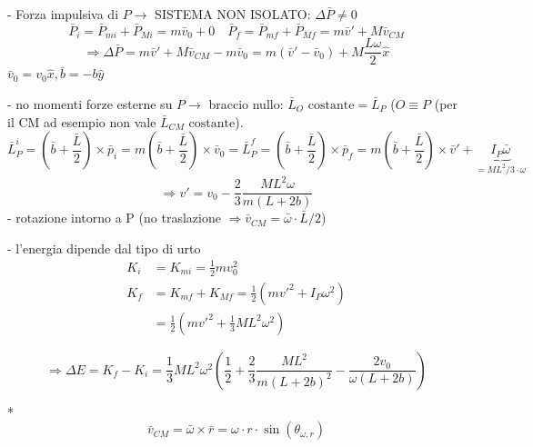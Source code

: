 \begin{figure}[H]
\raggedleft
{}
\end{figure}

- Forza impulsiva di $P \rightarrow$ SISTEMA NON ISOLATO: $\Delta \bar{P} \neq 0$
$$ \bar{P}_i = \bar{P}_{mi} + \bar{P}_{Mi} = m\bar{v}_0 + 0 \quad \bar{P}_f = \bar{P}_{mf} + \bar{P}_{Mf} = m\bar{v}' + M\bar{v}_{CM} $$
$$ \Rightarrow \Delta \bar{P} = m\bar{v}' + M\bar{v}_{CM} - m\bar{v}_0 = m(\bar{v}' - \bar{v}_0) + M \frac{L \omega}{2} \hat{x} $$
$\bar{v}_0 = v_0 \hat{x}, \bar{b} = -b \hat{y}$

- no momenti forze esterne su $P \rightarrow$ braccio nullo: $\bar{L}_O \text{ costante} = \bar{L}_P$
($O \equiv P$ (per il CM ad esempio non vale $\bar{L}_{CM} \text{ costante}$).
$$ \bar{L}_P^i = \left(\bar{b} + \frac{\bar{L}}{2}\right) \times \bar{p}_i = m\left(\bar{b} + \frac{\bar{L}}{2}\right) \times \bar{v}_0 = \bar{L}_P^f = \left(\bar{b} + \frac{\bar{L}}{2}\right) \times \bar{p}_f = m\left(\bar{b} + \frac{\bar{L}}{2}\right) \times \bar{v}' + \underbrace{I_P \bar{\omega}}_{= ML^2/3 \cdot \omega} $$
$$ \Rightarrow v' = v_0 - \frac{2}{3} \frac{M L^2 \omega}{m(L+2b)} $$
- rotazione intorno a P (no traslazione $\Rightarrow \bar{v}_{CM} = \bar{\omega} \cdot \bar{L}/2$)

- l'energia dipende dal tipo di urto
\begin{align*}
K_i &= K_{mi} = \frac{1}{2} m v_0^2 \\
K_f &= K_{mf} + K_{Mf} = \frac{1}{2} (m v'^2 + I_P \omega^2) \\
&= \frac{1}{2} \left( m v'^2 + \frac{1}{3} M L^2 \omega^2 \right)
\end{align*}

$$ \Rightarrow \Delta E = K_f - K_i = \frac{1}{3} M L^2 \omega^2 \left( \frac{1}{2} + \frac{2}{3} \frac{M L^2}{m(L+2b)^2} - \frac{2 v_0}{\omega(L+2b)} \right) $$

*
$$ \bar{v}_{CM} = \bar{\omega} \times \bar{r} = \omega \cdot r \cdot \sin(\theta_{\omega, r}) $$
